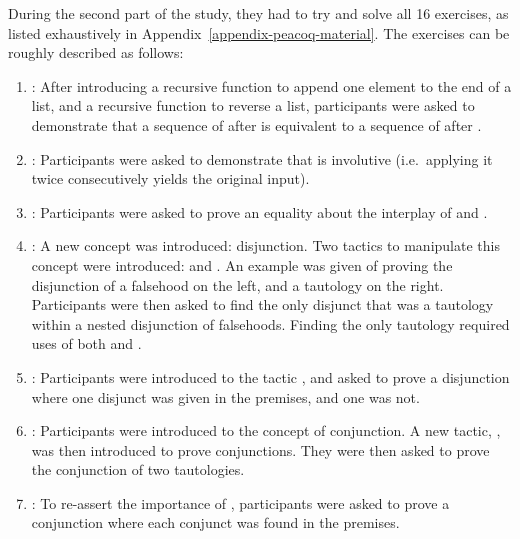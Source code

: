 During the second part of the study, they had to try and solve all 16 exercises,
as listed exhaustively in Appendix~\ref{appendix-peacoq-material}.  The
exercises can be roughly described as follows:

\begin{enumerate}

  \item {}: After introducing a recursive function
 to append one element to the end of a list, and a recursive
function  to reverse a list, participants were asked to
demonstrate that a sequence of  after  is
equivalent to a sequence of  after .

  \item {}: Participants were asked to demonstrate that
 is involutive (i.e.\ applying it twice consecutively yields the
original input).

  \item {}: Participants were asked to prove an
equality about the interplay of  and .

  \item {}: A new concept was introduced: disjunction.
Two tactics to manipulate this concept were introduced:  and
.  An example was given of proving the disjunction of a
falsehood on the left, and a tautology on the right.  Participants were then
asked to find the only disjunct that was a tautology within a nested disjunction
of falsehoods.  Finding the only tautology required uses of both
 and .

  \item {}: Participants were introduced to the tactic
, and asked to prove a disjunction where one disjunct was given
in the premises, and one was not.

  \item {}: Participants were introduced to the concept of
conjunction.  A new tactic, , was then introduced to prove
conjunctions.  They were then asked to prove the conjunction of two tautologies.

  \item {}: To re-assert the importance of ,
participants were asked to prove a conjunction where each conjunct was found in
the premises.


\end{enumerate}
